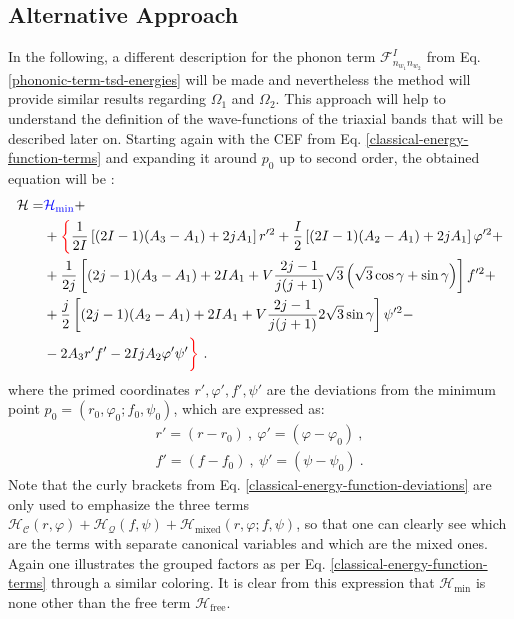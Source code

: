\subsection{Alternative Approach}

In the following, a different description for the phonon term $\mathcal{F}_{n_{w_1}n_{w_2}}^I$ from Eq. \ref{phononic-term-tsd-energies} will be made and nevertheless the method will provide similar results regarding $\Omega_1$ and $\Omega_2$. This approach will help to understand the definition of the wave-functions of the triaxial bands that will be described later on. Starting again with the CEF from Eq. \ref{classical-energy-function-terms} and expanding it around $p_0$ up to second order, the obtained equation will be \cite{raduta2020approach}:
\begin{align}
    \mathcal{H}=&{\color{blue}\mathcal{H}_\text{min}}+\nonumber\\
                &+{\color{red}\bigg\{}\frac{1}{2I}\left[(2I-1)(A_3-A_1)+2jA_1\right]r'^{2}+\frac{I}{2}\left[(2I-1)(A_2-A_1)+2jA_1\right]\varphi'^2+\nonumber\\
                &+\frac{1}{2j}\left[(2j-1)(A_3-A_1)+2IA_1+V\frac{2j-1}{j(j+1)}\sqrt{3}\left(\sqrt{3}\cos\gamma+\sin\gamma\right)\right]f'^2+\nonumber\\
                &+\frac{j}{2}\left[(2j-1)(A_2-A_1)+2IA_1+V\frac{2j-1}{j(j+1)}2\sqrt{3}\sin\gamma\right]\psi'^2-\nonumber\\
                &-2A_3r'f'-2IjA_2\varphi'\psi'{\color{red}\bigg\}}\ .
    \label{classical-energy-function-deviations}
\end{align}
where the primed coordinates $r',\varphi',f',\psi'$ are the deviations from the minimum point $p_0=(r_0,\varphi_0;f_0,\psi_0)$, which are expressed as:
\begin{align}
    r'=(r-r_0)\ ,\ \varphi'=(\varphi-\varphi_0)\ ,\nonumber\\
    f'=(f-f_0)\ ,\ \psi'=(\psi-\psi_0)\ .
\end{align}
Note that the curly brackets from Eq. \ref{classical-energy-function-deviations} are only used to emphasize the three terms $\mathcal{H}_\mathscr{C}(r,\varphi)+\mathcal{H}_\mathcal{Q}(f,\psi)+\mathcal{H}_\text{mixed}(r,\varphi;f,\psi)$, so that one can clearly see which are the terms with separate canonical variables and which are the mixed ones. Again one illustrates the grouped factors as per Eq. \ref{classical-energy-function-terms} through a similar coloring. It is clear from this expression that $\mathcal{H}_\text{min}$ is none other than the free term $\mathcal{H}_\text{free}$.

